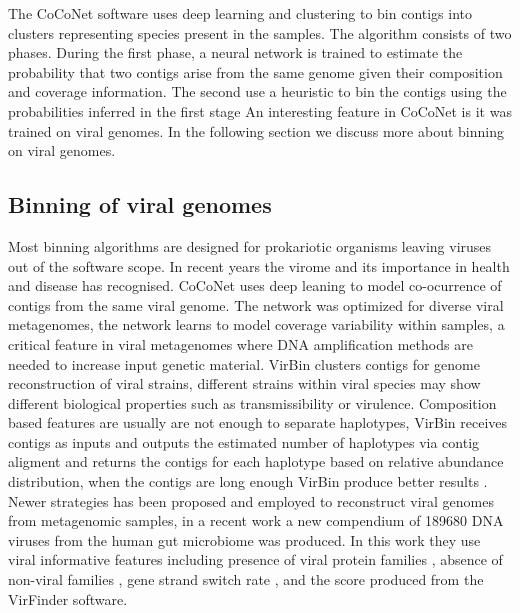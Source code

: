 \documentclass{article}
\begin{document}
The CoCoNet software uses deep learning and clustering to bin contigs into clusters representing species present in the samples.
The algorithm consists of two phases.
During the first phase, a neural network is trained to estimate the probability that two contigs arise from the same genome given their composition and coverage information.
The second use a heuristic to bin the contigs using the probabilities inferred in the first stage
An interesting feature in CoCoNet is it was trained on viral genomes. In the following section we discuss more about binning on viral genomes. 

\subsection{Binning of viral genomes}
Most binning algorithms are designed for prokariotic organisms leaving viruses out of the software scope.
In recent years the virome and its importance in health and disease has recognised.
CoCoNet uses deep leaning to model co-ocurrence of contigs from the same viral genome.
The network was optimized for diverse viral metagenomes, the network learns to model coverage variability within samples, a critical feature in viral metagenomes where DNA amplification methods are needed to increase input genetic material.
VirBin clusters contigs for genome reconstruction of viral strains, different strains within viral species may show different biological properties such as transmissibility or virulence. Composition based features are usually are not enough to separate haplotypes, VirBin receives contigs as inputs and outputs the estimated number of haplotypes via contig aligment and returns the contigs for each haplotype based on relative abundance distribution, when the contigs are long enough VirBin produce better results \cite{Chen2019virbin}.
Newer strategies has been proposed and employed to reconstruct viral genomes from metagenomic samples, in a recent work \cite{nayfach2021metagenomic} a new compendium of 189680 DNA viruses from the human gut microbiome was produced.
In this work they use viral informative features including presence of viral protein families \cite{paez2016uncovering}, absence of non-viral families \cite{el2019pfam}, gene strand switch rate \cite{roux2005combined}, and the score produced from the VirFinder \cite{ren2017virfinder} software.
\end{document}
